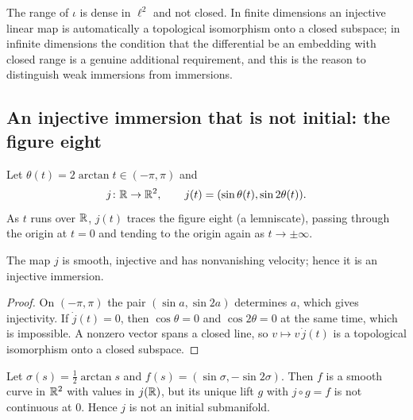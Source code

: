 \begin{remark}
  The range of $\iota$ is dense in $\ell^2$ and not closed. In finite dimensions an injective
  linear map is automatically a topological isomorphism onto a closed subspace; in infinite
  dimensions the condition that the differential be an embedding with closed range is a genuine
  additional requirement, and this is the reason to distinguish weak immersions from
  immersions.
\end{remark}

\subsection{An injective immersion that is not initial: the figure eight}

Let $\theta(t) = 2\arctan t \in (-\pi, \pi)$ and
\[
  j \colon \mathbb{R} \to \mathbb{R}^2, \qquad j(t) = (\sin\theta(t), \sin 2\theta(t)).
\]
As $t$ runs over $\mathbb{R}$, $j(t)$ traces the figure eight (a lemniscate), passing through the origin
at $t = 0$ and tending to the origin again as $t \to \pm\infty$.

\begin{proposition}
  \label{prop:ex-lemniscate-immersed}
  \leanok
  The map $j$ is smooth, injective and has nonvanishing velocity; hence it is an injective
  immersion.
\end{proposition}

\begin{proof}
  \leanok
  On $(-\pi, \pi)$ the pair $(\sin a, \sin 2a)$ determines $a$, which gives injectivity. If
  $\dot j(t) = 0$, then $\cos\theta = 0$ and $\cos 2\theta = 0$ at the same time, which is
  impossible. A nonzero vector spans a closed line, so $v \mapsto v\,\dot j(t)$ is a
  topological isomorphism onto a closed subspace.
\end{proof}

\begin{theorem}
  \label{thm:ex-lemniscate-not-initial}
  \leanok
  Let $\sigma(s) = \tfrac12\arctan s$ and $f(s) = (\sin\sigma, -\sin 2\sigma)$. Then $f$ is a
  smooth curve in $\mathbb{R}^2$ with values in $j(\mathbb{R})$, but its unique lift $g$ with $j \circ g = f$ is
  not continuous at $0$. Hence $j$ is not an initial submanifold.
\end{theorem}

